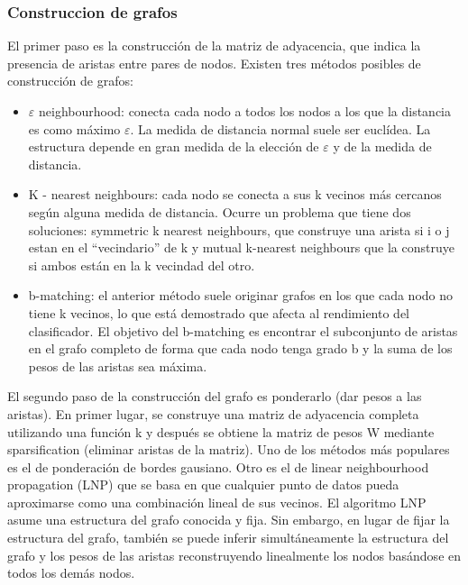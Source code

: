 \subsubsection{Construccion de grafos}
El primer paso es la construcción de la matriz de adyacencia, que indica la presencia de aristas entre pares de nodos. Existen tres métodos posibles de construcción de grafos:
\begin{itemize}
	\item $\varepsilon$ neighbourhood: conecta cada nodo a todos los nodos a los que la distancia es como máximo $\varepsilon$. La medida de distancia normal suele ser euclídea. La estructura depende en gran medida de la elección de $\varepsilon$ y de la medida de distancia.
	
	\item K - nearest neighbours: cada nodo se conecta a sus k vecinos más cercanos según alguna medida de distancia. Ocurre un problema que tiene dos soluciones: symmetric k nearest neighbours, que construye una arista si i o j estan en el “vecindario” de k y mutual k-nearest neighbours que la construye si ambos están en la k vecindad del otro.
	
	\item b-matching: el anterior método suele originar grafos en los que cada nodo no tiene k vecinos, lo que está demostrado que afecta al rendimiento del clasificador. El objetivo del b-matching es encontrar el subconjunto de aristas en el grafo completo de forma que cada nodo tenga grado b y la suma de los pesos de las aristas sea máxima.
\end{itemize}

El segundo paso de la construcción del grafo es ponderarlo (dar pesos a las aristas). En primer lugar, se construye una matriz de adyacencia completa utilizando una función k y después se obtiene la matriz de pesos W mediante sparsification (eliminar aristas de la matriz). Uno de los métodos más populares es el de ponderación de bordes gausiano. Otro es el de linear neighbourhood propagation (LNP) que se basa en que cualquier punto de datos pueda aproximarse como una combinación lineal de sus vecinos.
El algoritmo LNP asume una estructura del grafo conocida y fija. Sin embargo, en lugar de fijar la estructura del grafo, también se puede inferir simultáneamente la estructura del grafo y los pesos de las aristas reconstruyendo linealmente los nodos basándose en todos los demás nodos.

